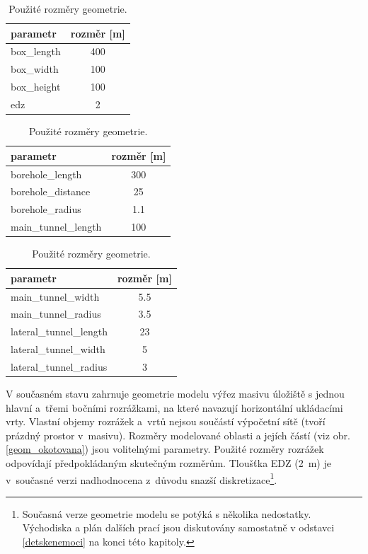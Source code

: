\documentclass[11pt,a4paper]{article}
\newcommand{\obraz}[1]{(viz obr. \ref{#1})}
\begin{document}
\begin{onehalfspacing}
\begin{table}[ht]
\begin{center}
    \caption{Použité rozměry geometrie.}
    \begin{tabular}{ | l | c |}
    \hline
    \small parametr & \small rozměr [m] \\ \hline
    \small box\_length & \small 400 \\ \hline
    \small box\_width & \small 100 \\ \hline
    \small box\_height & \small 100 \\ \hline
    \small edz & \small 2 \\ \hline
    \end{tabular}
    \begin{tabular}{ | l | c |}
    \hline
    \small parametr & \small rozměr [m] \\ \hline
    \small borehole\_length & \small 300 \\ \hline
    \small borehole\_distance & \small 25 \\ \hline
    \small borehole\_radius & \small 1.1 \\ \hline
    \small main\_tunnel\_length & \small 100 \\ \hline
    \end{tabular}
    \begin{tabular}{ | l | c |}
    \hline
    \small parametr &  \small rozměr [m] \\ \hline
    \small main\_tunnel\_width & \small 5.5 \\ \hline
    \small main\_tunnel\_radius & \small 3.5 \\ \hline
    \small lateral\_tunnel\_length & \small 23 \\ \hline
    \small lateral\_tunnel\_width & \small 5 \\ \hline
    \small lateral\_tunnel\_radius & \small 3 \\ \hline
    \end{tabular}
    \label{tab_parametry_geom}
\end{center}
\end{table}
\vspace{-0.3cm}

V současném stavu zahrnuje geometrie modelu výřez masivu úložiště s jednou hlavní a~třemi bočními rozrážkami, na které navazují horizontální ukládacími vrty. Vlastní objemy rozrážek a~vrtů nejsou součástí výpočetní sítě (tvoří prázdný prostor v~masivu). Rozměry modelované oblasti a jejích částí \obraz{geom_okotovana} jsou volitelnými parametry. Použité rozměry rozrážek odpovídají předpokládaným skutečným rozměrům. Tloušťka EDZ (2~m) je v~současné verzi nadhodnocena z~důvodu snazší diskretizace\footnote{Současná verze geometrie modelu se potýká s několika nedostatky. Východiska a plán dalších prací jsou diskutovány samostatně v odstavci \ref{detskenemoci} na konci této kapitoly.}.


\end{onehalfspacing}
\end{document}
